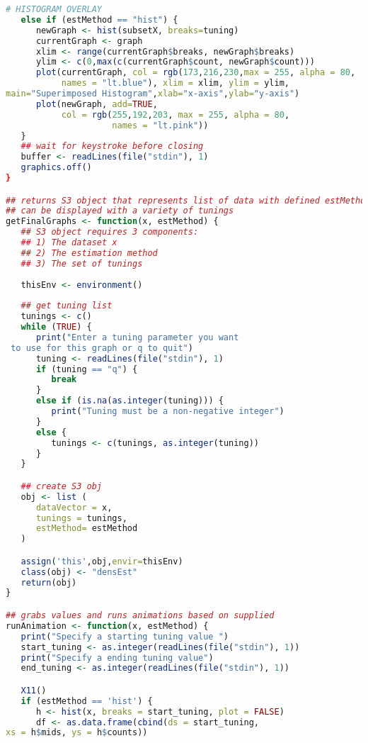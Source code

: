 \documentclass{article}
\begin{document}
\begin{lstlisting}[frame=single,language=R,showstringspaces=false]
   # HISTOGRAM OVERLAY
   else if (estMethod == "hist") {
      newGraph <- hist(subsetX, breaks=tuning)
      currentGraph <- graph
      xlim <- range(currentGraph$breaks, newGraph$breaks)
      ylim <- c(0,max(c(currentGraph$count, newGraph$count)))
      plot(currentGraph, col = rgb(173,216,230,max = 255, alpha = 80,
           names = "lt.blue"), xlim = xlim, ylim = ylim, 
main="Superimposed Histogram",xlab="x-axis",ylab="y-axis")
      plot(newGraph, add=TRUE,
           col = rgb(255,192,203, max = 255, alpha = 80,
                     names = "lt.pink"))
   }
   ## wait for keystroke before closing
   buffer <- readLines(file("stdin"), 1)
   graphics.off()
}

## returns S3 object that represents list of data with defined estMethod that
## can be displayed with a variety of tunings
getFinalGraphs <- function(x, estMethod) {
   ## S3 object requires 3 components:
   ## 1) The dataset x
   ## 2) The estimation method
   ## 3) The set of tunings
   
   thisEnv <- environment()
   
   ## get tuning list
   tunings <- c()
   while (TRUE) {
      print("Enter a tuning parameter you want
 to use for this graph or q to quit")
      tuning <- readLines(file("stdin"), 1)
      if (tuning == "q") {
         break
      }
      else if (is.na(as.integer(tuning))) {
         print("Tuning must be a non-negative integer")
      }
      else {
         tunings <- c(tunings, as.integer(tuning))
      }
   }

   ## create S3 obj
   obj <- list (
      dataVector = x,
      tunings = tunings,
      estMethod= estMethod
   )

   assign('this',obj,envir=thisEnv)
   class(obj) <- "densEst"
   return(obj)
}

## grabs values and runs animations based on supplied
runAnimation <- function(x, estMethod) {
   print("Specify a starting tuning value ")
   start_tuning <- as.integer(readLines(file("stdin"), 1))
   print("Specify a ending tuning value")
   end_tuning <- as.integer(readLines(file("stdin"), 1))

   X11()
   if (estMethod == 'hist') {
      h <- hist(x, breaks = start_tuning, plot = FALSE)
      df <- as.data.frame(cbind(ds = start_tuning, 
xs = h$mids, ys = h$counts))


\end{lstlisting}
\end{document}
